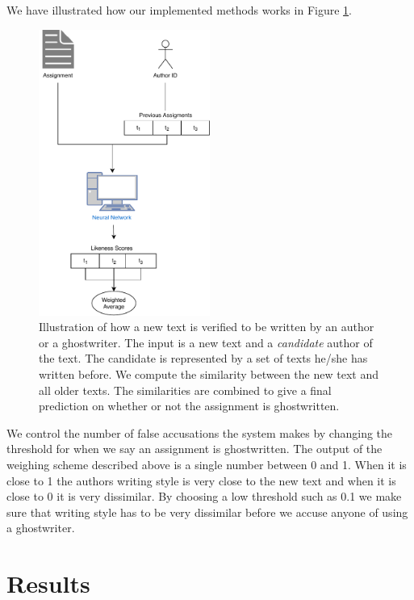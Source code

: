 \documentclass[11pt]{article}
\begin{document}
    We have illustrated how our implemented methods works in Figure
    \ref{fig:model}.

    \begin{figure}
        \centering
        \includegraphics[width=0.5\textwidth]{./pictures/Model}
        \caption{Illustration of how a new text is verified to be written by an
            author or a ghostwriter. The input is a new text and a
            \textit{candidate} author of the text. The candidate is represented
            by a set of texts he/she has written before. We compute the
            similarity between the new text and all older texts. The
            similarities are combined to give a final prediction on whether or
            not the assignment is ghostwritten.}
        \label{fig:model}
    \end{figure}

    We control the number of false accusations the system makes by changing the
    threshold for when we say an assignment is ghostwritten. The output of the
    weighing scheme described above is a single number between 0 and 1. When it
    is close to 1 the authors writing style is very close to the new text and
    when it is close to 0 it is very dissimilar. By choosing a low threshold
    such as 0.1 we make sure that writing style has to be very dissimilar before
    we accuse anyone of using a ghostwriter.


    \section{Results}
\end{document}
